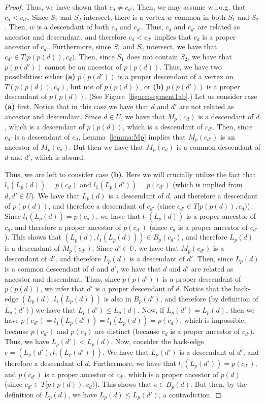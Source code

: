 \documentclass[11pt,a4paper]{article}
\begin{document}
\begin{proof}
Thus, we have shown that $c_d\neq c_{d'}$. Then, we may assume w.l.o.g. that $c_d<c_{d'}$. Since $S_1$ and $S_2$ intersect, there is a vertex $w$ common in both $S_1$ and $S_2$. Then, $w$ is a descendant of both $c_d$ and $c_{d'}$. Thus, $c_d$ and $c_{d'}$ are related as ancestor and descendant, and therefore $c_d<c_{d'}$ implies that $c_d$ is a proper ancestor of $c_{d'}$. Furthermore, since $S_1$ and $S_2$ intersect, we have that $c_{d'}\in T[p(p(d)),c_d)$. Then, since $S_1$ does not contain $S_2$, we have that $p(p(d'))$ cannot be an ancestor of $p(p(d))$. Thus, we have two possibilities: either \textbf{(a)} $p(p(d'))$ is a proper descendant of a vertex on $T(p(p(d)),c_d)$, but not of $p(p(d))$, or \textbf{(b)} $p(p(d'))$ is a proper descendant of $p(p(d))$. (See Figure~\ref{figure:segment1ab}.) Let us consider case \textbf{(a)} first. Notice that in this case we have that $d$ and $d'$ are not related as ancestor and descendant. Since $d\in U$, we have that $M_p(c_d)$ is a descendant of $d$, which is a descendant of $p(p(d))$, which is a descendant of $c_{d'}$. Then, since $c_{d'}$ is a descendant of $c_d$, Lemma~\ref{lemma:Mp} implies that $M_p(c_{d'})$ is an ancestor of $M_p(c_d)$. But then we have that $M_p(c_d)$ is a common descendant of $d$ and $d'$, which is absurd.

Thus, we are left to consider case \textbf{(b)}. Here we will crucially utilize the fact that $l_1(L_p(d))=p(c_d)$ and $l_1(L_p(d'))=p(c_{d'})$ (which is implied from $d,d'\in U$). We have that $L_p(d)$ is a descendant of $d$, and therefore a descendant of $p(p(d))$, and therefore a descendant of $c_{d'}$ (since $c_{d'}\in T[p(p(d)),c_d)$). Since $l_1(L_p(d))=p(c_d)$, we have that $l_1(L_p(d))$ is a proper ancestor of $c_d$, and therefore a proper ancestor of $p(c_{d'})$ (since $c_d$ is a proper ancestor of $c_{d'}$). This shows that $(L_p(d),l_1(L_p(d)))\in B_p(c_{d'})$, and therefore $L_p(d)$ is a descendant of $M_p(c_{d'})$. Since $d'\in U$, we have that $M_p(c_{d'})$ is a descendant of $d'$, and therefore $L_p(d)$ is a descendant of $d'$. Then, since $L_p(d)$ is a common descendant of $d$ and $d'$, we have that $d$ and $d'$ are related as ancestor and descendant. Thus, since $p(p(d'))$ is a proper descendant of $p(p(d))$, we infer that $d'$ is a proper descendant of $d$. Notice that the back-edge $(L_p(d),l_1(L_p(d)))$ is also in $B_p(d')$, and therefore (by definition of $L_p(d')$) we have that $L_p(d')\leq L_p(d)$. Now, if $L_p(d')=L_p(d)$, then we have  $p(c_{d'})=l_1(L_p(d'))=l_1(L_p(d))=p(c_{d})$, which is impossible, because $p(c_{d'})$ and $p(c_d)$ are distinct (because $c_d$ is a proper ancestor of $c_{d'})$. Thus, we have $L_p(d')<L_p(d)$. Now, consider the back-edge $e=(L_p(d'),l_1(L_p(d')))$. We have that $L_p(d')$ is a descendant of $d'$, and therefore a descendant of $d$. Furthermore, we have that $l_1(L_p(d'))=p(c_{d'})$, and $p(c_{d'})$ is a proper ancestor of $c_{d'}$, which is a proper ancestor of $p(d)$ (since $c_{d'}\in T[p(p(d)),c_d)$). This shows that $e\in B_p(d)$. But then, by the definition of $L_p(d)$, we have $L_p(d)\leq L_p(d')$, a contradiction. 


\end{proof}
\end{document}
